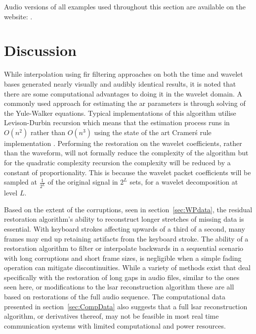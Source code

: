 Audio versions of all examples used throughout this section are available on the website: \siteURL.


\section{Discussion}\label{sec:RestorationDiscussion}

While interpolation using \DIFdelbegin {}\DIFdelend \DIFaddbegin \gls{fir} \DIFaddend filtering approaches on both the time and wavelet bases generated nearly visually and audibly identical results, it is noted that there are some computational advantages to doing it in the wavelet domain. A commonly used approach for estimating the \DIFdelbegin {}\DIFdelend \DIFaddbegin \gls{ar} \DIFaddend parameters is through solving of the Yule-Walker equations. Typical implementations of this algorithm utilise Levison-Durbin recursion which means that the estimation process runs in $O(n^2)$ \cite{Hayes1996} rather than $O(n^3)$ using the state of the art Cramer\'s rule implementation \cite{Habgood2012}. Performing the restoration on the wavelet coefficients, rather than the waveform, will not formally reduce the complexity of the algorithm but for the quadratic complexity recursion the complexity will be reduced by a constant of proportionality. This is because the wavelet packet coefficients will be sampled at $\frac{1}{2^L}$ of the original signal in $2^L$ sets, for a wavelet decomposition at level $L$.

Based on the extent of the corruptions, seen in section~\ref{sec:WPdata}, the residual restoration algorithm's ability to reconstruct longer stretches of missing data is essential. With keyboard strokes affecting upwards of a third of a second, many frames may end up retaining artifacts from the keyboard stroke. The ability of a restoration algorithm to filter or interpolate backwards in a sequential scenario with long corruptions and short frame sizes, is negligible when a simple fading operation can mitigate discontinuities. While a variety of methods exist that deal specifically with the restoration of long gaps in audio files, similar to the ones seen here, or modifications to the \DIFdelbegin {}\DIFdelend \DIFaddbegin \gls{lsar} \DIFaddend reconstruction algorithm \cite{Kauppinen2002a}\cite{Esquef2006} these are all based on restorations of the full audio sequence. The computational data presented in section~\ref{sec:CompData} also suggests that a full \DIFdelbegin {}\DIFdelend \DIFaddbegin \gls{lsar} \DIFaddend reconstruction algorithm, or derivatives thereof, may not be feasible in most real time communication systems with limited computational and power resources.

